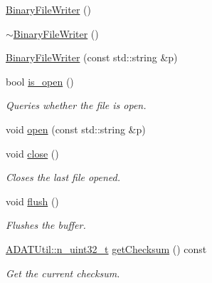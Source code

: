 \begin{DoxyCompactItemize}
\mbox{\hyperlink{classADATIO_1_1BinaryFileWriter_aa0579bad52db7809ed5d30b964aa3443}{Binary\+File\+Writer}} ()
\item 
\mbox{\hyperlink{classADATIO_1_1BinaryFileWriter_ae74f92826c49450ba710f22300718ada}{$\sim$\+Binary\+File\+Writer}} ()
\item 
\mbox{\hyperlink{classADATIO_1_1BinaryFileWriter_a7ccd0f56a5d98e909770f3198f94e9d9}{Binary\+File\+Writer}} (const std\+::string \&p)
\item 
bool \mbox{\hyperlink{classADATIO_1_1BinaryFileWriter_a891f81b41b18e3ba86c7e8af134b603e}{is\+\_\+open}} ()
\begin{DoxyCompactList}\small\item\em Queries whether the file is open. \end{DoxyCompactList}\item 
void \mbox{\hyperlink{classADATIO_1_1BinaryFileWriter_a943ba19816b403b36f50f72740ea856a}{open}} (const std\+::string \&p)
\item 
void \mbox{\hyperlink{classADATIO_1_1BinaryFileWriter_a20a1bdb753aaf28e60de49e80ddf953d}{close}} ()
\begin{DoxyCompactList}\small\item\em Closes the last file opened. \end{DoxyCompactList}\item 
void \mbox{\hyperlink{classADATIO_1_1BinaryFileWriter_ad914b901c6386a2ad7b2c8cf9bddfa9b}{flush}} ()
\begin{DoxyCompactList}\small\item\em Flushes the buffer. \end{DoxyCompactList}\item 
\mbox{\hyperlink{namespaceADATUtil_ad945a8afa4db2d1f89b731964adae97e}{A\+D\+A\+T\+Util\+::n\+\_\+uint32\+\_\+t}} \mbox{\hyperlink{classADATIO_1_1BinaryFileWriter_ad6f9d995a02d4b3e8e12ad18972d58a5}{get\+Checksum}} () const
\begin{DoxyCompactList}\small\item\em Get the current checksum. \end{DoxyCompactList}\end{DoxyCompactItemize}
